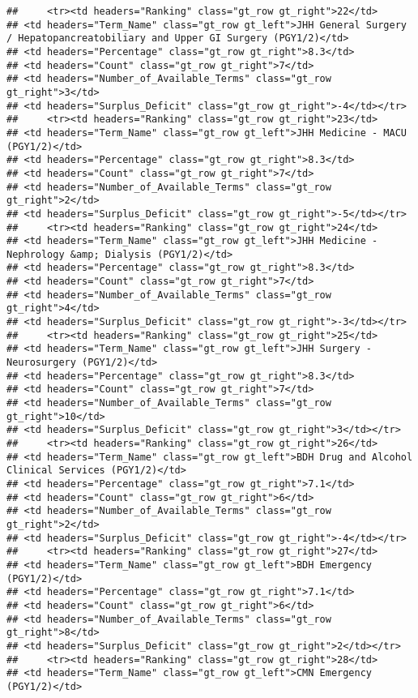 \documentclass[
]{article}
\begin{document}
\begin{verbatim}
##     <tr><td headers="Ranking" class="gt_row gt_right">22</td>
## <td headers="Term_Name" class="gt_row gt_left">JHH General Surgery / Hepatopancreatobiliary and Upper GI Surgery (PGY1/2)</td>
## <td headers="Percentage" class="gt_row gt_right">8.3</td>
## <td headers="Count" class="gt_row gt_right">7</td>
## <td headers="Number_of_Available_Terms" class="gt_row gt_right">3</td>
## <td headers="Surplus_Deficit" class="gt_row gt_right">-4</td></tr>
##     <tr><td headers="Ranking" class="gt_row gt_right">23</td>
## <td headers="Term_Name" class="gt_row gt_left">JHH Medicine - MACU (PGY1/2)</td>
## <td headers="Percentage" class="gt_row gt_right">8.3</td>
## <td headers="Count" class="gt_row gt_right">7</td>
## <td headers="Number_of_Available_Terms" class="gt_row gt_right">2</td>
## <td headers="Surplus_Deficit" class="gt_row gt_right">-5</td></tr>
##     <tr><td headers="Ranking" class="gt_row gt_right">24</td>
## <td headers="Term_Name" class="gt_row gt_left">JHH Medicine - Nephrology &amp; Dialysis (PGY1/2)</td>
## <td headers="Percentage" class="gt_row gt_right">8.3</td>
## <td headers="Count" class="gt_row gt_right">7</td>
## <td headers="Number_of_Available_Terms" class="gt_row gt_right">4</td>
## <td headers="Surplus_Deficit" class="gt_row gt_right">-3</td></tr>
##     <tr><td headers="Ranking" class="gt_row gt_right">25</td>
## <td headers="Term_Name" class="gt_row gt_left">JHH Surgery - Neurosurgery (PGY1/2)</td>
## <td headers="Percentage" class="gt_row gt_right">8.3</td>
## <td headers="Count" class="gt_row gt_right">7</td>
## <td headers="Number_of_Available_Terms" class="gt_row gt_right">10</td>
## <td headers="Surplus_Deficit" class="gt_row gt_right">3</td></tr>
##     <tr><td headers="Ranking" class="gt_row gt_right">26</td>
## <td headers="Term_Name" class="gt_row gt_left">BDH Drug and Alcohol Clinical Services (PGY1/2)</td>
## <td headers="Percentage" class="gt_row gt_right">7.1</td>
## <td headers="Count" class="gt_row gt_right">6</td>
## <td headers="Number_of_Available_Terms" class="gt_row gt_right">2</td>
## <td headers="Surplus_Deficit" class="gt_row gt_right">-4</td></tr>
##     <tr><td headers="Ranking" class="gt_row gt_right">27</td>
## <td headers="Term_Name" class="gt_row gt_left">BDH Emergency (PGY1/2)</td>
## <td headers="Percentage" class="gt_row gt_right">7.1</td>
## <td headers="Count" class="gt_row gt_right">6</td>
## <td headers="Number_of_Available_Terms" class="gt_row gt_right">8</td>
## <td headers="Surplus_Deficit" class="gt_row gt_right">2</td></tr>
##     <tr><td headers="Ranking" class="gt_row gt_right">28</td>
## <td headers="Term_Name" class="gt_row gt_left">CMN Emergency (PGY1/2)</td>

\end{verbatim}
\end{document}
